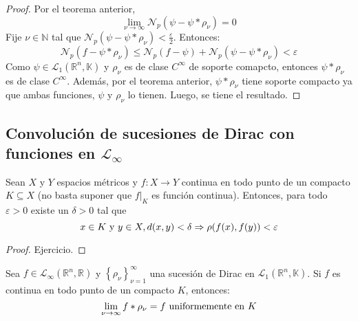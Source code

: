 \documentclass[12pt]{report}
\theoremstyle{largebreak}
\newcommand\cf[3]{\ensuremath{#1:#2\rightarrow#3}}
\newcommand{\N}[2]{\ensuremath{\mathcal{N}_{#1}\left(#2\right)}}
\begin{document}
\begin{proof}
        Por el teorema anterior,
        \begin{equation*}
            \lim_{\nu\rightarrow\infty}\N{p}{\psi-\psi*\rho_\nu}=0
        \end{equation*}
        Fije $\nu\in\mathbb{N}$ tal que $\N{p}{\psi-\psi*\rho_\nu}<\frac{\varepsilon}{2}$. Entonces:
        \begin{equation*}
            \N{p}{f-\psi*\rho_\nu}\leq\N{p}{f-\psi}+\N{p}{\psi-\psi*\rho_\nu}<\varepsilon
        \end{equation*}
        Como $\psi\in\mathcal{L}_1(\mathbb{R}^n,\mathbb{K})$ y $\rho_\nu$ es de clase $C^\infty$ de soporte comapcto, entonces $\psi*\rho_\nu$ es de clase $C^\infty$. Además, por el teorema anterior, $\psi*\rho_\nu$ tiene soporte compacto ya que ambas funciones, $\psi$ y $\rho_\nu$ lo tienen. Luego, se tiene el resultado.
    \end{proof}

    \subsection{Convolución de sucesiones de Dirac con funciones en $\mathcal{L}_\infty$}

    \begin{theor}
        Sean $X$ y $Y$ espacios métricos y $\cf{f}{X}{Y}$ continua en todo punto de un compacto $K\subseteq X$ (no basta suponer que $f\Big|_K$ es función continua). Entonces, para todo $\varepsilon>0$ existe un $\delta>0$ tal que
        \begin{equation*}
            x\in K\textup{ y }y\in X, d(x,y)<\delta\Rightarrow \rho(f(x),f(y))<\varepsilon
        \end{equation*}
    \end{theor}

    \begin{proof}
        Ejercicio.
    \end{proof}

    \begin{theor}
        Sea $f\in\mathcal{L}_\infty(\mathbb{R}^n,\mathbb{R})$ y $\left\{\rho_\nu \right\}_{\nu=1}^\infty$ una sucesión de Dirac en $\mathcal{L}_1(\mathbb{R}^n,\mathbb{K})$. Si $f$ es continua en todo punto de un compacto $K$, entonces:
        \begin{equation*}
            \lim_{\nu\rightarrow\infty}f*\rho_\nu=f\textup{ uniformemente en }K
        \end{equation*}
    \end{theor}
\end{document}
